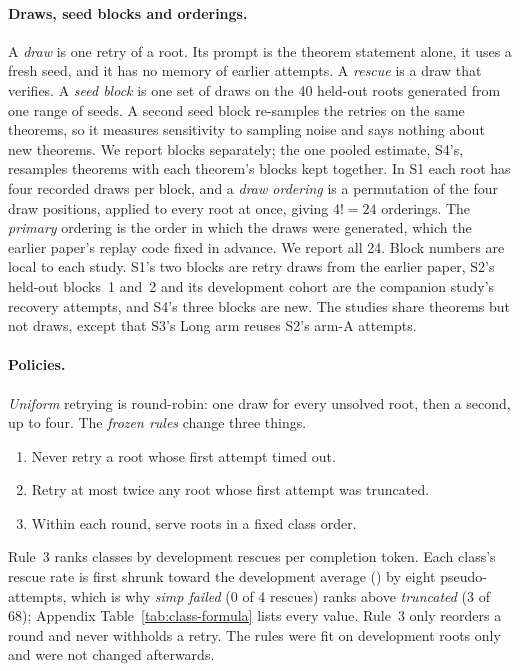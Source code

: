 \paragraph{Draws, seed blocks and orderings.}
A \emph{draw} is one retry of a root.  Its prompt is the theorem statement alone, it uses a fresh seed, and it has no memory of earlier attempts.  A \emph{rescue} is a draw that verifies.  A \emph{seed block} is one set of draws on the 40 held-out roots generated from one range of seeds.  A second seed block re-samples the retries on the same theorems, so it measures sensitivity to sampling noise and says nothing about new theorems.  We report blocks separately; the one pooled estimate, S4's, resamples theorems with each theorem's blocks kept together.  In S1 each root has four recorded draws per block, and a \emph{draw ordering} is a permutation of the four draw positions, applied to every root at once, giving $4!=24$ orderings.  The \emph{primary} ordering is the order in which the draws were generated, which the earlier paper's replay code fixed in advance.  We report all 24.  Block numbers are local to each study.  S1's two blocks are retry draws from the earlier paper, S2's held-out blocks~1 and~2 and its development cohort are the companion study's recovery attempts, and S4's three blocks are new.  The studies share theorems but not draws, except that S3's Long arm reuses S2's arm-A attempts.

\paragraph{Policies.}
\emph{Uniform} retrying is round-robin: one draw for every unsolved root, then a second, up to four.  The \emph{frozen rules} change three things.
\begin{enumerate}[leftmargin=*,itemsep=1pt,topsep=2pt]
  \item Never retry a root whose first attempt timed out.
  \item Retry at most twice any root whose first attempt was truncated.
  \item Within each round, serve roots in a fixed class order.
\end{enumerate}
Rule~3 ranks classes by development rescues per completion token.  Each class's rescue rate is first shrunk toward the development average (\CrGlobalRate{}) by eight pseudo-attempts, which is why \emph{simp failed} (0 of 4 rescues) ranks above \emph{truncated} (3 of 68); Appendix Table~\ref{tab:class-formula} lists every value.  Rule~3 only reorders a round and never withholds a retry.  The rules were fit on development roots only and were not changed afterwards.


